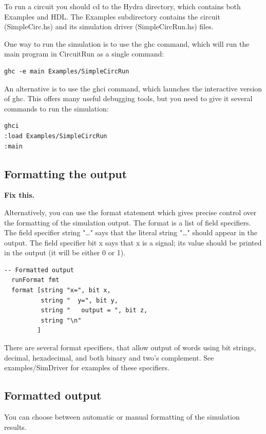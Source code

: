 \documentclass[]{svmono}
\begin{document}
To run a circuit you should cd to the Hydra directory, which
contains both Examples and HDL.  The Examples subdirectory
contains the circuit (SimpleCirc.hs) and its simulation driver
(SimpleCircRun.hs) files.

One way to run the simulation is to use the ghc command, which
will run the main program in CircuitRun as a single command:

\begin{verbatim}
ghc -e main Examples/SimpleCircRun
\end{verbatim}

An alternative is to use the ghci command, which launches the
interactive version of ghc.  This offers many useful debugging
tools, but you need to give it several commands to run the
simulation:

\begin{verbatim}
ghci
:load Examples/SimpleCircRun
:main
\end{verbatim}
\subsection*{Formatting the output}
\label{sec:org853c582}

\textbf{Fix this.}

Alternatively, you can use the format statement which gives
precise control over the formatting of the simulation output.  The
format is a list of field specifiers.  The field specifier string
"\ldots{}" says that the literal string "\ldots{}" should appear in the
output.  The field specifier bit x says that x is a signal; its
value should be printed in the output (it will be either 0 or 1).

\begin{verbatim}
-- Formatted output
  runFormat fmt
  format [string "x=", bit x,
          string "  y=", bit y,
          string "   output = ", bit z,
          string "\n"
         ]
\end{verbatim}

There are several format specifiers, that allow output of words
using bit strings, decimal, hexadecimal, and both binary and two's
complement.  See examples/SimDriver for examples of these
specifiers.
\subsection*{Formatted output}
\label{sec:org6f11382}

You can choose between automatic or manual formatting of the
simulation results.
\end{document}
